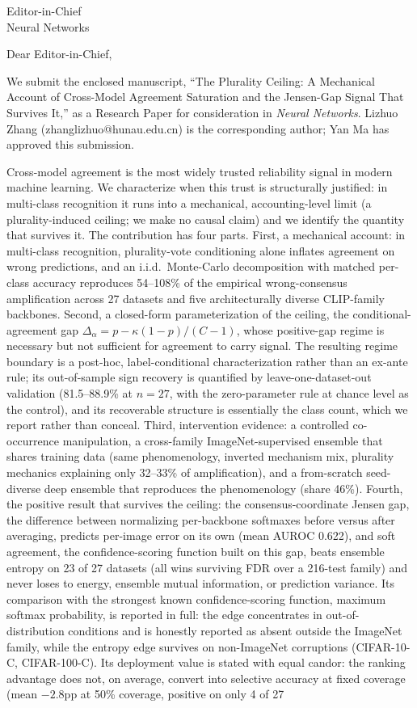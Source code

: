 \documentclass[10pt]{letter}
\begin{document}
\begin{letter}{Editor-in-Chief \\ Neural Networks}

\opening{Dear Editor-in-Chief,}

We submit the enclosed manuscript, ``The Plurality Ceiling: A Mechanical Account of Cross-Model Agreement Saturation and the Jensen-Gap Signal That Survives It,'' as a Research Paper for consideration in \emph{Neural Networks}. Lizhuo Zhang (zhanglizhuo@hunau.edu.cn) is the corresponding author; Yan Ma has approved this submission.

Cross-model agreement is the most widely trusted reliability signal in modern machine learning. We characterize when this trust is structurally justified: in multi-class recognition it runs into a mechanical, accounting-level limit (a plurality-induced ceiling; we make no causal claim) and we identify the quantity that survives it. The contribution has four parts. First, a mechanical account: in multi-class recognition, plurality-vote conditioning alone inflates agreement on wrong predictions, and an i.i.d.\ Monte-Carlo decomposition with matched per-class accuracy reproduces 54--108\% of the empirical wrong-consensus amplification across 27 datasets and five architecturally diverse CLIP-family backbones. Second, a closed-form parameterization of the ceiling, the conditional-agreement gap $\Delta_\alpha = p - \kappa(1-p)/(C-1)$, whose positive-gap regime is necessary but not sufficient for agreement to carry signal. The resulting regime boundary is a post-hoc, label-conditional characterization rather than an ex-ante rule; its out-of-sample sign recovery is quantified by leave-one-dataset-out validation (81.5--88.9\% at $n{=}27$, with the zero-parameter rule at chance level as the control), and its recoverable structure is essentially the class count, which we report rather than conceal. Third, intervention evidence: a controlled co-occurrence manipulation, a cross-family ImageNet-supervised ensemble that shares training data (same phenomenology, inverted mechanism mix, plurality mechanics explaining only 32--33\% of amplification), and a from-scratch seed-diverse deep ensemble that reproduces the phenomenology (share 46\%). Fourth, the positive result that survives the ceiling: the consensus-coordinate Jensen gap, the difference between normalizing per-backbone softmaxes before versus after averaging, predicts per-image error on its own (mean AUROC 0.622), and soft agreement, the confidence-scoring function built on this gap, beats ensemble entropy on 23 of 27 datasets (all wins surviving FDR over a 216-test family) and never loses to energy, ensemble mutual information, or prediction variance. Its comparison with the strongest known confidence-scoring function, maximum softmax probability, is reported in full: the edge concentrates in out-of-distribution conditions and is honestly reported as absent outside the ImageNet family, while the entropy edge survives on non-ImageNet corruptions (CIFAR-10-C, CIFAR-100-C). Its deployment value is stated with equal candor: the ranking advantage does not, on average, convert into selective accuracy at fixed coverage (mean $-2.8$pp at 50\% coverage, positive on only 4 of 27 
\end{letter}
\end{document}

